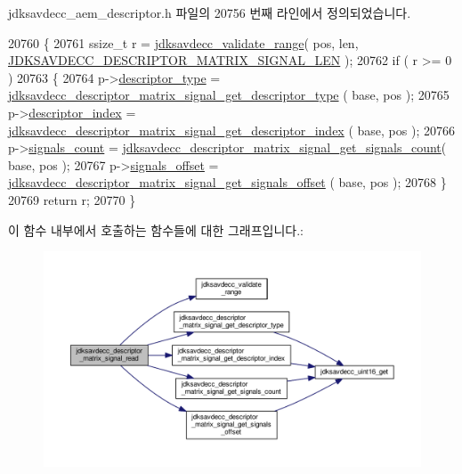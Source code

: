 jdksavdecc\+\_\+aem\+\_\+descriptor.\+h 파일의 20756 번째 라인에서 정의되었습니다.


\begin{DoxyCode}
20760 \{
20761     ssize\_t r = \hyperlink{group__util_ga9c02bdfe76c69163647c3196db7a73a1}{jdksavdecc\_validate\_range}( pos, len, 
      \hyperlink{group__descriptor__matrix__signal_ga590520dc48bf98bf3267e05a1f2cd374}{JDKSAVDECC\_DESCRIPTOR\_MATRIX\_SIGNAL\_LEN} );
20762     \textcolor{keywordflow}{if} ( r >= 0 )
20763     \{
20764         p->\hyperlink{structjdksavdecc__descriptor__matrix__signal_ab7c32b6c7131c13d4ea3b7ee2f09b78d}{descriptor\_type} = 
      \hyperlink{group__descriptor__matrix__signal_ga82eac98c48c280448fe9fc8741492df6}{jdksavdecc\_descriptor\_matrix\_signal\_get\_descriptor\_type}
      ( base, pos );
20765         p->\hyperlink{structjdksavdecc__descriptor__matrix__signal_a042bbc76d835b82d27c1932431ee38d4}{descriptor\_index} = 
      \hyperlink{group__descriptor__matrix__signal_ga71631c6c15a97fa8bbd6037574816b22}{jdksavdecc\_descriptor\_matrix\_signal\_get\_descriptor\_index}
      ( base, pos );
20766         p->\hyperlink{structjdksavdecc__descriptor__matrix__signal_aa06daacf08fd67693f794aedf330942b}{signals\_count} = 
      \hyperlink{group__descriptor__matrix__signal_ga2c1281595390366b6d468d977235086d}{jdksavdecc\_descriptor\_matrix\_signal\_get\_signals\_count}(
       base, pos );
20767         p->\hyperlink{structjdksavdecc__descriptor__matrix__signal_a7b876bd908f8076038ffd84de9845183}{signals\_offset} = 
      \hyperlink{group__descriptor__matrix__signal_ga3c4b995934488591a96dc28b7e68810a}{jdksavdecc\_descriptor\_matrix\_signal\_get\_signals\_offset}
      ( base, pos );
20768     \}
20769     \textcolor{keywordflow}{return} r;
20770 \}
\end{DoxyCode}


이 함수 내부에서 호출하는 함수들에 대한 그래프입니다.\+:
\nopagebreak
\begin{figure}[H]
\begin{center}
\leavevmode
\includegraphics[width=350pt]{group__descriptor__matrix__signal_ga2ebfbd17f0a3993c1efa824f3a8faf1a_cgraph}
\end{center}
\end{figure}


